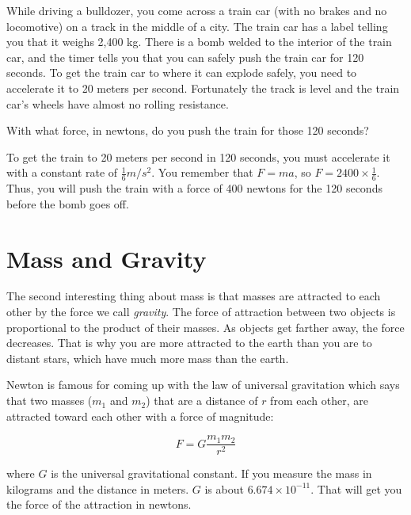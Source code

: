 \begin{Exercise}[title={Acceleration}, label=acceleration_train]
  
While driving a bulldozer, you come across a train car (with no brakes
and no locomotive) on a track in the middle of a city. The train car
has a label telling you that it weighs 2,400 kg. There is a bomb
welded to the interior of the train car, and the timer tells you that
you can safely push the train car for 120 seconds.  To get the train
car to where it can explode safely, you need to accelerate it to 20 meters per
second. Fortunately the track is level and the train car's wheels have
almost no rolling resistance.

With what force, in newtons, do you push the train for those 120 seconds?

\end{Exercise}
\begin{Answer}[ref=acceleration_train]
To get the train to 20 meters per second in 120 seconds, you must
accelerate it with a constant rate of $\frac{1}{6} m/s^2$. You
remember that $F = m a$, so $F = 2400 \times \frac{1}{6}$. Thus, you
will push the train with a force of 400 newtons for the 120 seconds
before the bomb goes off.
\end{Answer}

\section{Mass and Gravity}

The second interesting thing about mass is that masses are
attracted to each other by the force we call \textit{gravity}. The
force of attraction between two objects is proportional to the product
of their masses. As objects get farther away, the force decreases.
That is why you are more attracted to the earth than you are to
distant stars, which have much more mass than the earth.

Newton is famous for coming up with the law of universal gravitation
which says that two masses ($m_1$ and $m_2$) that are a distance of
$r$ from each other, are attracted toward each other with a force of
magnitude:

$$F = G\frac{m_1 m_2}{r^2}$$

where $G$ is the universal gravitational constant. If you measure the
mass in kilograms and the distance in meters. $G$ is about $6.674
\times 10^{-11}$.  That will get you the force of the attraction in
newtons.

